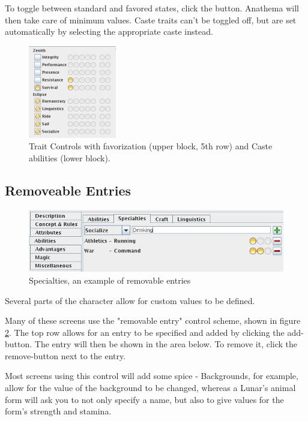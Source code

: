 To toggle between standard and favored states, click the button. Anathema will then take care of minimum values. Caste traits can't be toggled off, but are set automatically by selecting the appropriate caste instead.

\begin{figure}
	\centering
		\includegraphics{images/TraitControl.jpg}
	\caption{Trait Controls with favorization (upper block, 5th row) and Caste abilities (lower block).}
	\label{fig:TraitControl}
\end{figure}

\subsection{Removeable Entries}

\begin{figure}
	\centering
		\includegraphics[width=1.00\textwidth]{images/RemovableEntries.jpg}
	\caption{Specialties, an example of removable entries}
	\label{fig:RemovableEntries}
\end{figure}

Several parts of the character allow for custom values to be defined.

Many of these screens use the "removable entry" control scheme, shown in figure \ref{fig:RemovableEntries}.
The top row allows for an entry to be specified and added by clicking the add-button. The entry will then be shown in the area below. To remove it, click the remove-button next to the entry.

Most screens using this control will add some spice - Backgrounds, for example, allow for the value of the background to be changed, whereas a Lunar's animal form will ask you to not only specify a name, but also to give values for the form's strength and stamina.

